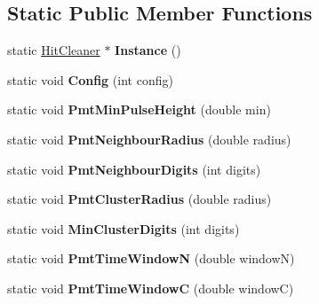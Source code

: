 \subsection*{Static Public Member Functions}
\begin{DoxyCompactItemize}
\item 
\hypertarget{classHitCleaner_a4ac1bde4eec18c427ed249409a6d5d3a}{static \hyperlink{classHitCleaner}{Hit\-Cleaner} $\ast$ {\bfseries Instance} ()}\label{classHitCleaner_a4ac1bde4eec18c427ed249409a6d5d3a}

\item 
\hypertarget{classHitCleaner_afdf345b322cbef82deb9f35eaddb02d1}{static void {\bfseries Config} (int config)}\label{classHitCleaner_afdf345b322cbef82deb9f35eaddb02d1}

\item 
\hypertarget{classHitCleaner_a94987b09a59d9781277f76eee63994a1}{static void {\bfseries Pmt\-Min\-Pulse\-Height} (double min)}\label{classHitCleaner_a94987b09a59d9781277f76eee63994a1}

\item 
\hypertarget{classHitCleaner_af6d017ac189b0eb6abf064756e78f5ac}{static void {\bfseries Pmt\-Neighbour\-Radius} (double radius)}\label{classHitCleaner_af6d017ac189b0eb6abf064756e78f5ac}

\item 
\hypertarget{classHitCleaner_a43b5a1ac75e62334a8e9ff539a9b34df}{static void {\bfseries Pmt\-Neighbour\-Digits} (int digits)}\label{classHitCleaner_a43b5a1ac75e62334a8e9ff539a9b34df}

\item 
\hypertarget{classHitCleaner_a71881188d23e57c9afb0c8179ff9c5e3}{static void {\bfseries Pmt\-Cluster\-Radius} (double radius)}\label{classHitCleaner_a71881188d23e57c9afb0c8179ff9c5e3}

\item 
\hypertarget{classHitCleaner_a8074ae3702ee872e8c8b4504f3bf3987}{static void {\bfseries Min\-Cluster\-Digits} (int digits)}\label{classHitCleaner_a8074ae3702ee872e8c8b4504f3bf3987}

\item 
\hypertarget{classHitCleaner_a2efa2634319c4ff56e51ba28415146a9}{static void {\bfseries Pmt\-Time\-Window\-N} (double window\-N)}\label{classHitCleaner_a2efa2634319c4ff56e51ba28415146a9}

\item 
\hypertarget{classHitCleaner_a1962dfdb70798529f8f560c1b6f233fc}{static void {\bfseries Pmt\-Time\-Window\-C} (double window\-C)}\label{classHitCleaner_a1962dfdb70798529f8f560c1b6f233fc}

\end{DoxyCompactItemize}


